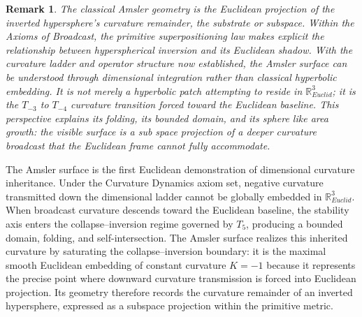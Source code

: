 \documentclass[final,onefignum,onetabnum]{siamart}
\newtheorem{remark}{Remark}
\begin{document}
\begin{remark}
The classical Amsler geometry is the Euclidean projection of the inverted hypersphere’s curvature remainder, the substrate or subspace. Within the Axioms of Broadcast, the primitive superpositioning law makes explicit the relationship between hyperspherical inversion and its Euclidean shadow. With the curvature ladder and operator structure now established, the Amsler surface can be understood through dimensional integration rather than classical hyperbolic embedding. It is not merely a hyperbolic patch attempting to reside in $\mathbb{R}_{Euclid}^3$; it is the $T_{-3}$ to $T_{-4}$ curvature transition forced toward the Euclidean baseline. This perspective explains its folding, its bounded domain, and its sphere like area growth: the visible surface is a sub space projection of a deeper curvature broadcast that the Euclidean frame cannot fully accommodate.
\end{remark}

\begin{theorem}
The Amsler surface is the first Euclidean demonstration of dimensional curvature inheritance. Under the Curvature Dynamics axiom set, negative curvature transmitted down the dimensional ladder cannot be globally embedded in $\mathbb{R}_{Euclid}^3$. When broadcast curvature descends toward the Euclidean baseline, the stability axis enters the collapse–inversion regime governed by $T_5$, producing a bounded domain, folding, and self-intersection.
The Amsler surface realizes this inherited curvature by saturating the collapse–inversion boundary: it is the maximal smooth Euclidean embedding of constant curvature $K=-1$ because it represents the precise point where downward curvature transmission is forced into Euclidean projection. Its geometry therefore records the curvature remainder of an inverted hypersphere, expressed as a subspace projection within the primitive metric.
\end{theorem}
\end{document}
